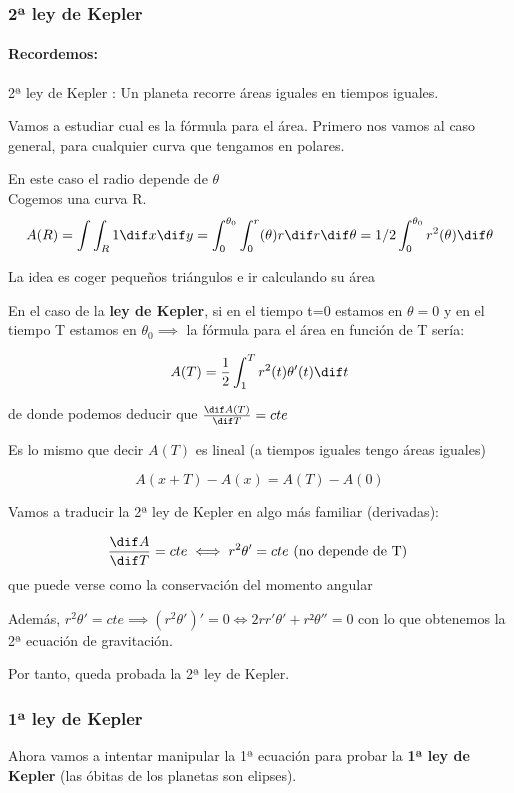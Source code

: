 \subsubsection{2ª ley de Kepler}
\paragraph{Recordemos:}
2ª ley de Kepler : Un planeta recorre áreas iguales en tiempos iguales.

Vamos a estudiar cual es la fórmula para el área.
Primero nos vamos al caso general, para cualquier curva que tengamos en polares.

En este caso el radio depende de $\theta$ \\
Cogemos una curva R.\\

$$A(R) = \int\int_R 1 \dif x \dif y = \int_0^{\theta_0} \int_0^r(\theta) r \dif r \dif \theta = 1/2 \int_0^{\theta_0} r^2(\theta) \dif\theta$$

La idea es coger pequeños triángulos e ir calculando su área

En el caso de la \textbf{ley de Kepler}, si en el tiempo t=0 estamos en $\theta = 0$ y en el tiempo T estamos en $\theta_0 \implies$ la fórmula para el área en función de T sería:

$$A(T) = \frac{1}{2} \int_1^T r^2(t) \theta'(t) \dif t$$


de donde podemos deducir que $\frac {\dif A(T)}{\dif T} = cte$

Es lo mismo que decir $A(T)$ es lineal (a tiempos iguales tengo áreas iguales)

\[A(x + T) - A(x) = A(T) - A(0)\]

Vamos a traducir la 2ª ley de Kepler en algo más familiar (derivadas):

\[\frac{\dif A}{\dif T} = cte \iff r^2\theta' = cte  \text{ (no depende de T) }\]
que puede verse como la conservación del momento angular

Además, $r^2\theta' = cte  \implies (r^2\theta')' = 0 \iff 2rr'\theta' + r²\theta'' =0$ con lo que obtenemos la 2ª ecuación de gravitación.

Por tanto, queda probada la 2ª ley de Kepler.

\subsubsection{1ª ley de Kepler}
Ahora vamos a intentar manipular la 1ª ecuación para probar la \textbf{1ª ley de Kepler} (las óbitas de los planetas son elipses).

